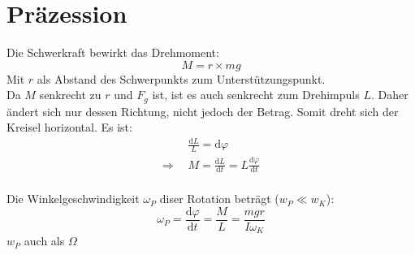 \section{Pr\"azession}
Die Schwerkraft bewirkt das Drehmoment:
\[
	M=r\times mg
\]
Mit $r$ als Abstand des Schwerpunkts zum Unterst\"utzungspunkt.\\
\newline
Da $M$ senkrecht zu $r$ und $F_g$ ist, ist es auch senkrecht zum Drehimpuls $L$. Daher \"andert sich nur dessen Richtung, nicht jedoch der Betrag. Somit dreht sich der Kreisel horizontal. Es ist:
\[
	\begin{split}
		&\frac{\mathrm{d}L}{L}=\mathrm{d}\varphi\\
		\Rightarrow\ \ &M=\frac{\mathrm{d}L}{\mathrm{d}t}=L\frac{\mathrm{d}\varphi}{\mathrm{d}t}
	\end{split}
\]\\
Die Winkelgeschwindigkeit $\omega_P$ diser Rotation betr\"agt ($w_P\ll w_K$):
\[
	\boxed{
		\omega_P=\frac{\mathrm{d}\varphi}{\mathrm{d}t}=\frac{M}{L}=\frac{mgr}{I\omega_K}
	}
\]
\footnotesize $w_P$ auch als $\Omega$\\
\begin{figure}[h!]
\center
{}
\end{figure}